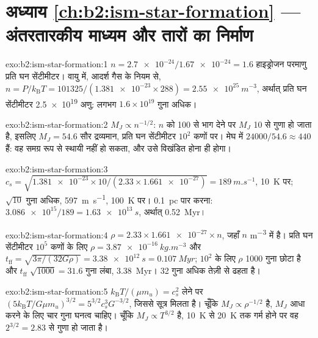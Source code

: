 \section*{अध्याय \ref{ch:b2:ism-star-formation} --- अंतरतारकीय माध्यम और तारों का निर्माण}

\begin{solution}{exo:b2:ism-star-formation:1}
$n = \num{2.7e-24}/\num{1.67e-24} = 1.6$ हाइड्रोजन परमाणु प्रति घन सेंटीमीटर। वायु में, आदर्श गैस के नियम से,
$n = P/k_{\mathrm B}T = 101325/(\num{1.381e-23}\times288) = \qty{2.55e25}{m^{-3}}$,
अर्थात् प्रति घन सेंटीमीटर \num{2.5e19} अणु: लगभग $1.6\times10^{19}$ गुना
अधिक।
\end{solution}

\begin{solution}{exo:b2:ism-star-formation:2}
$M_J \propto n^{-1/2}$: $n$ को 100 से भाग देने पर $M_J$ 10 से गुणा हो जाता है, इसलिए
$M_J = 54.6$ सौर द्रव्यमान, प्रति घन सेंटीमीटर $10^2$ कणों पर। मेघ में
$\num{24000}/54.6 \approx 440$  हैं: वह समग्र रूप से स्थायी नहीं हो सकता, और उसे
विखंडित होना ही होगा।
\end{solution}

\begin{solution}{exo:b2:ism-star-formation:3}
$c_s = \sqrt{\num{1.381e-23}\times10/(2.33\times\num{1.661e-27})} =
\qty{189}{m.s^{-1}}$, \qty{10}{K} पर; $\sqrt{10}$ गुना अधिक, \qty{597}{m.s^{-1}},
\qty{100}{K} पर। \qty{0.1}{pc} पार करना: $\num{3.086e15}/189 = \qty{1.63e13}{s}$,
अर्थात् \qty{0.52}{Myr}।
\end{solution}

\begin{solution}{exo:b2:ism-star-formation:4}
$\rho = 2.33\times\num{1.661e-27}\times n$, जहाँ $n$ \unit{m^{-3}} में है। प्रति घन सेंटीमीटर $10^5$
कणों के लिए $\rho = \qty{3.87e-16}{kg.m^{-3}}$ और
$t_{\mathrm{ff}} = \sqrt{3\pi/(32G\rho)} = \qty{3.38e12}{s} = \qty{0.107}{Myr}$;
$10^2$ के लिए $\rho$ \num{1000} गुना छोटा है और $t_{\mathrm{ff}}$ $\sqrt{1000} = 31.6$
गुना लंबा, \qty{3.38}{Myr}।  32 गुना अधिक तेज़ी से ढहता है।
\end{solution}

\begin{solution}{exo:b2:ism-star-formation:5}
$k_{\mathrm B}T/(\mu m_u) = c_s^2$ लेने पर $(5k_{\mathrm B}T/G\mu m_u)^{3/2} =
5^{3/2}c_s^3G^{-3/2}$, जिससे सूत्र मिलता है। चूँकि $M_J \propto \rho^{-1/2}$ है,
$M_J$ आधा करने के लिए चार गुना घनत्व चाहिए। चूँकि $M_J \propto T^{3/2}$ है,
\qty{10}{K} से \qty{20}{K} तक गर्म होने पर वह $2^{3/2} = 2.83$ से गुणा हो जाता है।
\end{solution}

